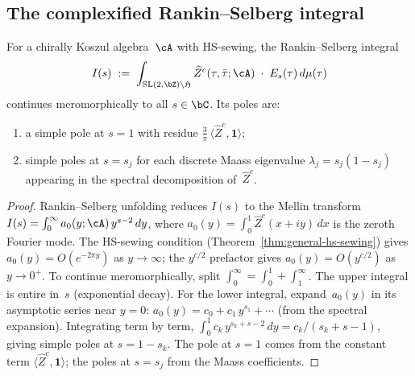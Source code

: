 \subsection{The complexified Rankin--Selberg integral}%
\label{subsec:complexified-eisenstein-integral}%

\begin{proposition}%
\label{prop:rs-analytic-continuation}%
\ClaimStatusProvedHere%
%
For a chirally Koszul algebra~$\cA$ with HS-sewing, the
Rankin--Selberg integral
\begin{equation}\label{eq:rs-complexified}
 I(s)
 \;:=\;
 \int_{\mathrm{SL}(2,\bZ)\backslash\mathfrak{H}}
 \widehat{Z}^c(\tau,\bar\tau;\cA)
 \;\cdot\;E_s(\tau)\,d\mu(\tau)
\end{equation}
continues meromorphically to all $s\in\bC$. Its poles are:
\begin{enumerate}[label=\textup{(\roman*)}]
\item a simple pole at $s = 1$ with residue
 $\tfrac{3}{\pi}\,\langle\widehat{Z}^c,\mathbf{1}\rangle$;
\item simple poles at $s = s_j$ for each discrete Maass
 eigenvalue $\lambda_j = s_j(1-s_j)$ appearing in the
 spectral decomposition of~$\widehat{Z}^c$.
\end{enumerate}
\end{proposition}

\begin{proof}
Rankin--Selberg unfolding reduces $I(s)$ to the Mellin
transform
$I(s) = \int_0^\infty a_0(y;\cA)\,y^{s-2}\,dy$,
where
$a_0(y) = \int_0^1 \widehat{Z}^c(x+iy)\,dx$
is the zeroth Fourier mode. The HS-sewing condition
(Theorem~\ref{thm:general-hs-sewing})
gives $a_0(y) = O(e^{-2\pi y})$ as $y\to\infty$; the
$y^{c/2}$ prefactor gives $a_0(y) = O(y^{c/2})$ as
$y\to 0^+$. To continue meromorphically, split
$\int_0^\infty = \int_0^1 + \int_1^\infty$. The upper
integral is entire in~$s$ (exponential decay). For the
lower integral, expand~$a_0(y)$ in its asymptotic series
near $y=0$:
$a_0(y) = c_0 + c_1\,y^{s_1} + \cdots$ (from the spectral
expansion). Integrating term by term,
$\int_0^1 c_k\,y^{s_k+s-2}\,dy = c_k/(s_k+s-1)$, giving
simple poles at $s = 1 - s_k$. The pole at $s=1$ comes
from the constant term
$\langle\widehat{Z}^c,\mathbf{1}\rangle$; the poles at
$s=s_j$ from the Maass coefficients.
\end{proof}

